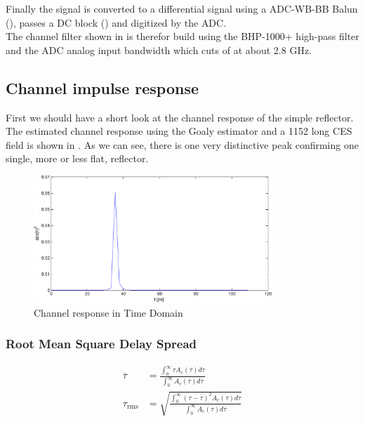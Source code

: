 Finally the signal is converted to a differential signal using a ADC-WB-BB Balun
(), passes a \gls{DC} block ()
and digitized by the \gls{ADC}. \\

The channel filter shown in  is therefor build using
the BHP-1000+ high-pass filter and the \gls{ADC} analog input bandwidth which
cuts of at about 2.8 GHz. \\

\subsection{Channel impulse response}
\label{sec:res_450_h}
First we should have a short look at the channel response of the simple
reflector. The estimated channel response using the Goaly estimator and a
1152 long \gls{CES} field is shown in .
As we can see, there is one very distinctive peak confirming one single,
more or less flat, reflector. \\

\begin{figure}[p]
  \centering
  \includegraphics[width=0.8\textwidth]{figures/matlab/res_450_h}
  \caption{Channel response in Time Domain}
  \label{fig:res_450_h}
\end{figure}

\subsubsection{Root Mean Square Delay Spread}
\begin{align}
  \overline{\tau} &=\frac{\int_0^\infty\tau A_c(\tau)d\tau}{\int_0^\infty A_c(\tau)d\tau} \\
  \tau_{\text{rms}} &=\sqrt{\frac{\int_0^\infty(\tau-\overline{\tau})^2
      A_c(\tau)d\tau}{\int_0^\infty A_c(\tau)d\tau}}
\end{align}

